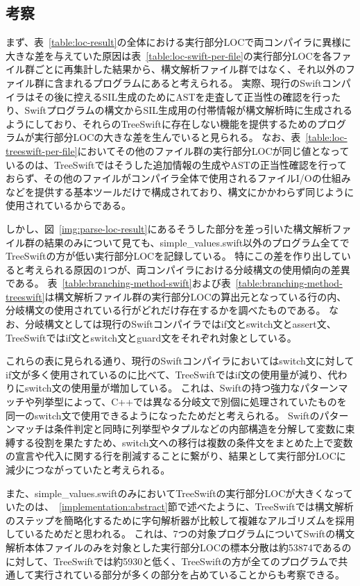 \subsection{考察}

まず、表~\ref{table:loc-result}の全体における実行部分LOCで両コンパイラに異様に大きな差を与えていた原因は表~\ref{table:loc-swift-per-file}の実行部分LOCを各ファイル群ごとに再集計した結果から、構文解析ファイル群ではなく、それ以外のファイル群に含まれるプログラムにあると考えられる。
実際、現行のSwiftコンパイラはその後に控えるSIL生成のためにASTを走査して正当性の確認を行ったり、Swiftプログラムの構文からSIL生成用の付帯情報が構文解析時に生成されるようにしており、それらのTreeSwiftに存在しない機能を提供するためのプログラムが実行部分LOCの大きな差を生んでいると見られる。
なお、表~\ref{table:loc-treeswift-per-file}においてその他のファイル群の実行部分LOCが同じ値となっているのは、TreeSwiftではそうした追加情報の生成やASTの正当性確認を行っておらず、その他のファイルがコンパイラ全体で使用されるファイルI/Oの仕組みなどを提供する基本ツールだけで構成されており、構文にかかわらず同じように使用されているからである。

しかし、図~\ref{img:parse-loc-result}にあるそうした部分を差っ引いた構文解析ファイル群の結果のみについて見ても、simple\_values.swift以外のプログラム全てでTreeSwiftの方が低い実行部分LOCを記録している。
特にこの差を作り出していると考えられる原因の1つが、両コンパイラにおける分岐構文の使用傾向の差異である。
表~\ref{table:branching-method-swift}および表~\ref{table:branching-method-treeswift}は構文解析ファイル群の実行部分LOCの算出元となっている行の内、分岐構文の使用されている行がどれだけ存在するかを調べたものである。
なお、分岐構文としては現行のSwiftコンパイラではif文とswitch文とassert文、TreeSwiftではif文とswitch文とguard文をそれぞれ対象としている。

これらの表に見られる通り、現行のSwiftコンパイラにおいてはswitch文に対してif文が多く使用されているのに比べて、TreeSwiftではif文の使用量が減り、代わりにswitch文の使用量が増加している。
これは、Swiftの持つ強力なパターンマッチや列挙型によって、C++では異なる分岐文で別個に処理されていたものを同一のswitch文で使用できるようになったためだと考えられる。
Swiftのパターンマッチは条件判定と同時に列挙型やタプルなどの内部構造を分解して変数に束縛する役割を果たすため、switch文への移行は複数の条件文をまとめた上で変数の宣言や代入に関する行を削減することに繋がり、結果として実行部分LOCに減少につながっていたと考えられる。

また、simple\_values.swiftのみにおいてTreeSwiftの実行部分LOCが大きくなっていたのは、~\ref{implementation:abstract}節で述べたように、TreeSwiftでは構文解析のステップを簡略化するために字句解析器が比較して複雑なアルゴリズムを採用しているためだと思われる。
これは、7つの対象プログラムについてSwiftの構文解析本体ファイルのみを対象とした実行部分LOCの標本分散は約53874であるのに対して、TreeSwiftでは約5930と低く、TreeSwiftの方が全てのプログラムで共通して実行されている部分が多くの部分を占めていることからも考察できる。

